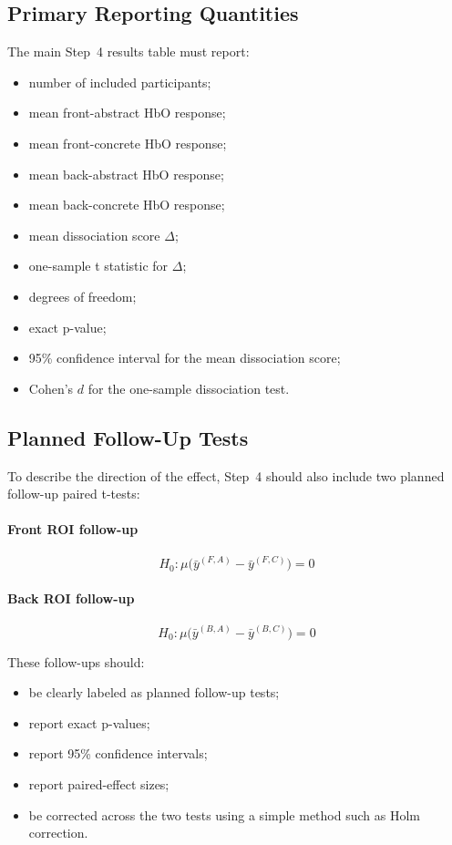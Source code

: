 \documentclass[11pt]{article}
\begin{document}
\subsection{Primary Reporting Quantities}
The main Step~4 results table must report:
\begin{itemize}
    \item number of included participants;
    \item mean front-abstract HbO response;
    \item mean front-concrete HbO response;
    \item mean back-abstract HbO response;
    \item mean back-concrete HbO response;
    \item mean dissociation score \(\Delta\);
    \item one-sample t statistic for \(\Delta\);
    \item degrees of freedom;
    \item exact p-value;
    \item 95\% confidence interval for the mean dissociation score;
    \item Cohen's \(d\) for the one-sample dissociation test.
\end{itemize}

\subsection{Planned Follow-Up Tests}
To describe the direction of the effect, Step~4 should also include two planned follow-up paired t-tests:

\paragraph{Front ROI follow-up}
\begin{equation}
H_0: \mu\bigl(\bar{y}^{(F,A)} - \bar{y}^{(F,C)}\bigr) = 0
\end{equation}

\paragraph{Back ROI follow-up}
\begin{equation}
H_0: \mu\bigl(\bar{y}^{(B,A)} - \bar{y}^{(B,C)}\bigr) = 0
\end{equation}

These follow-ups should:
\begin{itemize}
    \item be clearly labeled as planned follow-up tests;
    \item report exact p-values;
    \item report 95\% confidence intervals;
    \item report paired-effect sizes;
    \item be corrected across the two tests using a simple method such as Holm correction.
\end{itemize}
\end{document}

